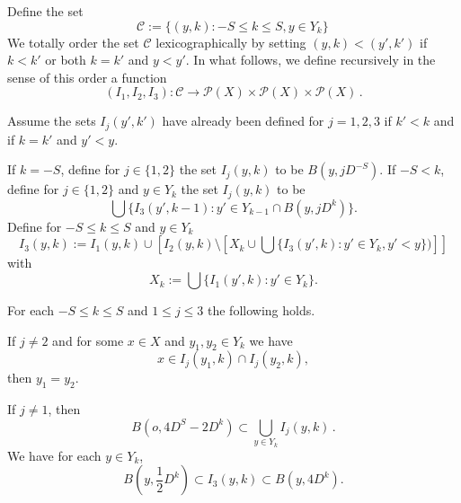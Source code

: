 Define the set
\begin{equation}
    \mathcal{C}:= \{(y,k): -S\le k\le S, y\in Y_k\}\,
\end{equation}
We totally order the set $\mathcal{C}$ lexicographically by setting
$(y,k)<(y',k')$ if $k< k'$ or both $k=k'$ and $y<y'$.
In what follows, we define recursively in the sense of this order a function
\begin{equation}
    (I_1,I_2,I_3): \mathcal{C}\to \mathcal{P}(X)\times \mathcal{P}(X)\times \mathcal{P}(X)\, .
\end{equation}


Assume the sets ${I}_j(y',k')$ have already been defined for $j=1,2,3$ if $k'<k$ and if $k=k'$ and $y'<y$.




If $k=-S$, define for $j\in \{1,2\}$ the set
${I}_j(y,k)$ to be $B(y,jD^{-S})$.
If $-S<k$, define for $j\in \{1,2\}$
and $y\in Y_k$ the set ${I}_j(y,k)$ to be
\begin{equation}\label{defineij}
\bigcup\{I_3(y',k-1):
y'\in Y_{k-1}\cap B(y,jD^k)\}.
\end{equation}
Define for {$-S\leq k\leq S$} and $y\in Y_k$
\begin{equation}\label{definei3}
I_3(y,k):={I_1}(y,k)\cup \left[{I_2}(y,k)\setminus \left[X_k\cup \bigcup\{I_3(y',k):y'\in Y_{k}, y'<y\})\right]\right]
\end{equation}
with
\begin{equation}
      X_{k}:=\bigcup\{I_1(y', k):y'\in Y_{k}\}.
\end{equation}


\begin{lemma}
    \label{basic-grid-structure}
    For each $-S\le k\le S$ and $1\le j\le 3$
    the following holds.

    If $j\neq 2$ and for some $x\in X$ and $y_1,y_2\in Y_k$ we have
    \begin{equation}\label{disji}
        x\in I_j(y_1,k)\cap I_j(y_2,k),
    \end{equation}
    then $y_1=y_2$.

    If $j\neq 1$, then
    \begin{equation}\label{unioni}
    B(o, 4D^S-2D^k)\subset \bigcup_{y\in Y_k} I_j(y,k)\, .
    \end{equation}
    We have for each $y\in Y_k$,
    \begin{equation}\label{squeezedyadic}
        B(y,\frac 12 D^k) \subset I_3(y,k)\subset
        B(y,4D^k).
    \end{equation}
\end{lemma}

